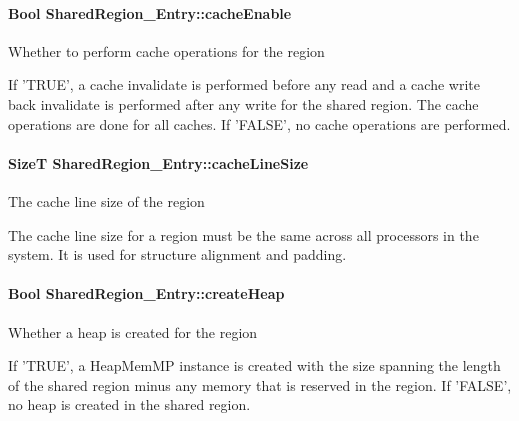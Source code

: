 \paragraph[{cache\-Enable}]{\setlength{\rightskip}{0pt plus 5cm}Bool Shared\-Region\-\_\-\-Entry\-::cache\-Enable}\label{struct_shared_region___entry_a3aeb47b20eb18950a8ae1fb09d1ebade}
Whether to perform cache operations for the region \begin{DoxyVerb}   If 'TRUE', a cache invalidate is performed before any read
   and a cache write back invalidate is performed after any
   write for the shared region.  The cache operations are done
   for all caches.  If 'FALSE', no cache operations are performed.\end{DoxyVerb}
\paragraph[{cache\-Line\-Size}]{\setlength{\rightskip}{0pt plus 5cm}Size\-T Shared\-Region\-\_\-\-Entry\-::cache\-Line\-Size}\label{struct_shared_region___entry_ad083825edd4d4a99389328d87976e4c5}
The cache line size of the region \begin{DoxyVerb}   The cache line size for a region must be the same across
   all processors in the system.  It is used for structure
   alignment and padding.\end{DoxyVerb}
\paragraph[{create\-Heap}]{\setlength{\rightskip}{0pt plus 5cm}Bool Shared\-Region\-\_\-\-Entry\-::create\-Heap}\label{struct_shared_region___entry_a5db88d5d170d041d872527e9b5b71020}
Whether a heap is created for the region \begin{DoxyVerb}   If 'TRUE', a HeapMemMP instance is created with the size
   spanning the length of the shared region minus any memory
   that is reserved in the region.  If 'FALSE', no heap
   is created in the shared region.\end{DoxyVerb}
